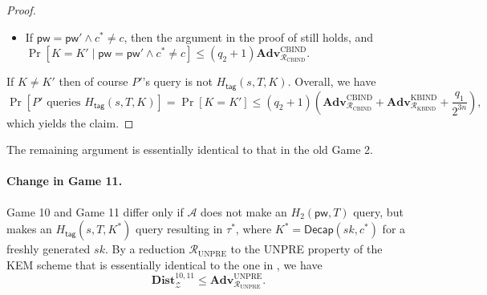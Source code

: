 \documentclass{article}
\theoremstyle{plain}
\theoremstyle{definition}
\theoremstyle{remark}
\newcommand{\adv}{\mathcal{A}}
\newcommand{\env}{\mathcal{Z}}
\newcommand{\red}{\mathcal{R}}
\newcommand{\Adv}{\mathbf{Adv}}
\newcommand{\Dist}{\mathbf{Dist}}
\newcommand{\Encap}{\mathsf{Encap}}
\newcommand{\Decap}{\mathsf{Decap}}
\newcommand{\Hkey}{H_\mathsf{key}}
\newcommand{\Htag}{H_\mathsf{tag}}
\newcommand{\pw}{\mathsf{pw}}
\newcommand{\NewSession}{\mathsf{NewSession}}
\begin{document}
\begin{proof}
\begin{itemize}
\begin{enumerate}
        \item On $(\NewSession, sid, P', P, \pw', \text{``respondent''})$ from $\env$ and $(s^*,T^*)$ from $\adv$, if $\neg(\pw \neq \pw' \land (s^*,T^*) = (s,T))$, abort. Otherwise
            \begin{enumerate}
              \item If $\adv$ has not queried $H_2(\pw',T)$, make this query on behalf of $P'$.
              \item Compute $SK' := \Hkey(K')$ and $\tau' := \Htag(s,T,K')$. Output $SK'$ to $\env$, and send $(c,\tau')$ to $\adv$. ($c$ and $K'$ are part of $\red_\mathrm{KBIND}$'s input.)
            \end{enumerate}
        \item On $(c^*,\tau^*)$ from $\adv$, output $c^*$.
      \end{enumerate}
      By an argument similar to that under Game 5 in , $\red_\text{KBIND}$'s aborting probability in step 2 is upper-bounded by $q_1(q_2+1)/2^{3n}$. Assuming $\red_\text{KBIND}$ does not abort in step 2, $\Decap(sk,c^*) = K'$, and $\red_\text{KBIND}$'s guess of index $j$ is correct, the only difference between Game 1/2 and $\red_\text{KBIND}$'s simulation (until $\adv$ sends $c^*$) is that $\red_\text{KBIND}$ uses its input $pk'$ to program $H_1(\pw',r')$, and then uses its inputs $(c,K') \gets \Encap(pk')$ as the $P'$-to-$P$ message and compute $SK'$ and $\tau'$. Since $(c,K')$ are also computed as $\Encap(pk')$ in Game 1/2, $\red_\text{KBIND}$ simulates Game 1/2 perfectly. Furthermore, $\red_\text{KBIND}$ wins the KBIND game. We have
      \[
      \Pr[K = K' \mid \pw \neq \pw'] \leq (q_2+1)\left(\Adv_{\red_\text{KBIND}}^\text{KBIND} + \frac{q_1}{2^{3n}}\right).
      \]
  \item If $\pw = \pw' \land c^* \neq c$, then the argument in the proof of  still holds, and $\Pr[K = K' \mid \pw = \pw' \land c^* \neq c] \leq (q_2+1)\Adv_{\red_\text{CBIND}}^\text{CBIND}$.
\end{itemize}

If $K \neq K'$ then of course $P'$'s query is not $\Htag(s,T,K)$. Overall, we have
\[
\Pr[P'\text{ queries }\Htag(s,T,K)] = \Pr[K = K'] \leq (q_2+1)\left(\Adv_{\red_\text{CBIND}}^\text{CBIND} + \Adv_{\red_\text{KBIND}}^\text{KBIND} + \frac{q_1}{2^{3n}}\right),
\]
which yields the claim.
\end{proof}
The remaining argument is essentially identical to that in the old Game 2.

\paragraph{Change in Game 11.}
Game 10 and Game 11 differ only if $\adv$ does not make an $H_2(\pw,T)$ query, but makes an $\Htag(s,T,K^*)$ query resulting in $\tau^*$, where $K^* = \Decap(sk,c^*)$ for a freshly generated $sk$. By a reduction $\red_\text{UNPRE}$ to the UNPRE property of the KEM scheme that is essentially identical to the one in , we have
\[
\Dist_\env^{10,11} \leq \Adv_{\red_\text{UNPRE}}^\text{UNPRE}.
\]
\end{document}
